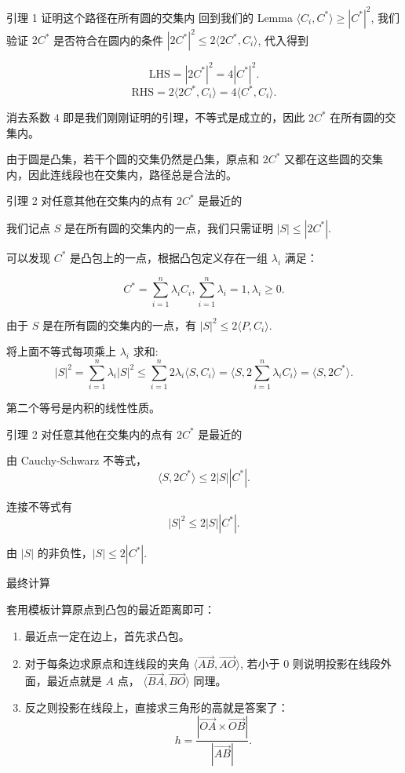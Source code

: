 \documentclass{beamer}
\begin{document}
{\begin{frame}{引理 1 证明这个路径在所有圆的交集内}
回到我们的 Lemma $\langle C_i, C^\ast \rangle \ge |C^\ast|^2$, 我们验证 $2C^\ast$ 是否符合在圆内的条件 $|2C^\ast|^2 \le 2 \langle 2C^\ast, C_i \rangle$, 代入得到

\[
  \text{LHS} = |2C^\ast|^2 = 4|C^\ast|^2.
\]
\[
  \text{RHS} = 2 \langle 2C^\ast, C_i \rangle = 4\langle C^\ast, C_i \rangle.
\]

消去系数 $4$ 即是我们刚刚证明的引理，不等式是成立的，因此 $2C^\ast$ 在所有圆的交集内。

由于圆是凸集，若干个圆的交集仍然是凸集，原点和 $2C^\ast$ 又都在这些圆的交集内，因此连线段也在交集内，路径总是合法的。

\end{frame}

\begin{frame}{引理 2 对任意其他在交集内的点有 $2C^\ast$ 是最近的}

我们记点 $S$ 是在所有圆的交集内的一点，我们只需证明 $|S| \le |2C^\ast|$.

可以发现 $C^\ast$ 是凸包上的一点，根据凸包定义存在一组 $\lambda_i$ 满足：

\[
    C^\ast = \sum_{i = 1}^{n} \lambda_i C_i,    \sum_{i = 1}^{n} \lambda_i = 1, \lambda_i \ge 0.
\]

由于 $S$ 是在所有圆的交集内的一点，有 $|S|^2 \le 2\langle P, C_i \rangle$.

将上面不等式每项乘上 $\lambda_i$ 求和:
\[
  |S|^2 = \sum_{i = 1}^{n} \lambda_i |S|^2 \le \sum_{i = 1}^{n} 2\lambda_i \langle S, C_i \rangle = \langle S, 2\sum_{i = 1}^{n}\lambda_i  C_i \rangle = \langle S, 2C^\ast \rangle.
\]

第二个等号是内积的线性性质。

\end{frame}

\begin{frame}{引理 2 对任意其他在交集内的点有 $2C^\ast$ 是最近的}

由 Cauchy-Schwarz 不等式，
\[
  \langle S, 2C^\ast \rangle \le 2 |S||C^\ast|.
\]

连接不等式有 \[
  |S|^2 \le 2 |S||C^\ast|.
\]

由 $|S|$ 的非负性，$|S| \le 2 |C^\ast|$.

\end{frame}

\begin{frame}{最终计算}

套用模板计算原点到凸包的最近距离即可：

\begin{enumerate}
  \item 最近点一定在边上，首先求凸包。
  \item 对于每条边求原点和连线段的夹角 $\langle \overrightarrow{AB}, \overrightarrow{AO} \rangle$, 若小于 $0$ 则说明投影在线段外面，最近点就是 $A$ 点， $\langle \overrightarrow{BA}, \overrightarrow{BO} \rangle$ 同理。
  \item 反之则投影在线段上，直接求三角形的高就是答案了：\[
    h = \frac{|\overrightarrow{OA} \times \overrightarrow{OB} |}{|\overrightarrow{AB}|}.
  \]
\end{enumerate}

\end{frame}

}
\end{document}
